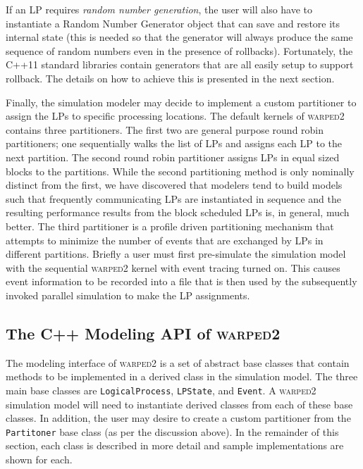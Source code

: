 \documentclass[11pt]{book}
\begin{document}
If an LP requires \emph{random number generation}, the user will also have to instantiate a Random
Number Generator object that can save and restore its internal state (this is needed so that the
generator will always produce the same sequence of random numbers even in the presence of
rollbacks).  Fortunately, the C++11 standard libraries contain generators that are all easily setup
to support rollback.  The details on how to achieve this is presented in the next section.

Finally, the simulation modeler may decide to implement a custom partitioner to assign the LPs to
specific processing locations.  The default kernels of \textsc{warped2} contains three partitioners.
The first two are general purpose round robin partitioners; one sequentially walks the list of LPs
and assigns each LP to the next partition.  The second round robin partitioner assigns LPs in equal
sized blocks to the partitions.  While the second partitioning method is only nominally distinct
from the first, we have discovered that modelers tend to build models such that frequently
communicating LPs are instantiated in sequence and the resulting performance results from the block
scheduled LPs is, in general, much better.  The third partitioner is a profile driven partitioning
mechanism that attempts to minimize the number of events that are exchanged by LPs in different
partitions.  Briefly a user must first pre-simulate the simulation model with the sequential
\textsc{warped2} kernel with event tracing turned on.  This causes event information to be recorded
into a file that is then used by the subsequently invoked parallel simulation to make the LP
assignments.

\subsection{The C++ Modeling API of \textsc{warped2}}


The modeling interface of \textsc{warped2} is a set of abstract base classes that contain methods to
be implemented in a derived class in the simulation model.  The three main base classes are
\texttt{LogicalProcess}, \texttt{LPState}, and \texttt{Event}.  A \textsc{warped2} simulation model
will need to instantiate derived classes from each of these base classes.  In addition, the user may
desire to create a custom partitioner from the \texttt{Partitoner} base class (as per the discussion
above).  In the remainder of this section, each class is described in more detail and sample
implementations are shown for each.
\end{document}
